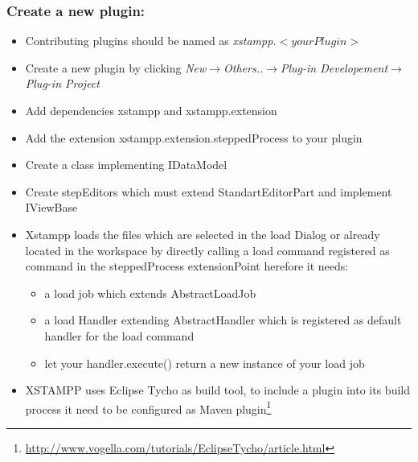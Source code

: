 \subsubsection{Create a new plugin:}
\begin{itemize}
\item Contributing plugins should be named as \textit{xstampp.}$<your Plugin>$
\item Create a new plugin by clicking \textit{New}$\rightarrow$\textit{Others..}$\rightarrow$\textit{Plug-in Developement}$\rightarrow$\textit{Plug-in Project}
\item Add dependencies xstampp and xstampp.extension
\item Add the extension xstampp.extension.steppedProcess to your plugin
\item Create a class implementing IDataModel
\item Create stepEditors which must extend StandartEditorPart and implement IViewBase
\item Xstampp loads the files which are selected in the load Dialog or already located in the workspace 
	  by directly calling a load command registered as command in the steppedProcess extensionPoint herefore it needs:
	\begin{itemize}
	\item a load job which extends AbstractLoadJob
	\item a load Handler extending AbstractHandler which is registered as default handler for the load command 
	\item let your handler.execute() return a new instance of your load job
	\end{itemize}
\item XSTAMPP uses Eclipse Tycho as build tool, to include a  plugin into its build process it need to be configured as Maven plugin\footnote{\url{http://www.vogella.com/tutorials/EclipseTycho/article.html}}
\end{itemize}

